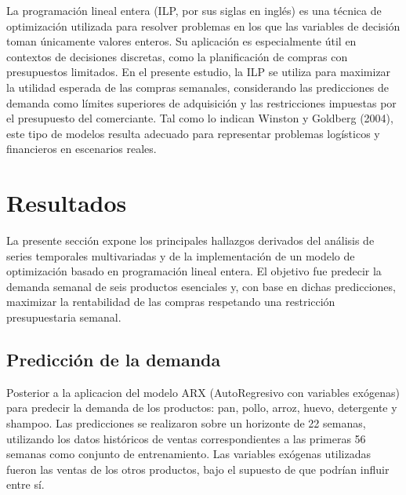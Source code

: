 \documentclass[12pt]{article}
\begin{document}
La programación lineal entera (ILP, por sus siglas en inglés) es una técnica de optimización utilizada para resolver problemas en los que las variables de decisión toman únicamente valores enteros. Su aplicación es especialmente útil en contextos de decisiones discretas, como la planificación de compras con presupuestos limitados. En el presente estudio, la ILP se utiliza para maximizar la utilidad esperada de las compras semanales, considerando las predicciones de demanda como límites superiores de adquisición y las restricciones impuestas por el presupuesto del comerciante. Tal como lo indican Winston y Goldberg (2004), este tipo de modelos resulta adecuado para representar problemas logísticos y financieros en escenarios reales.

\section{Resultados}

La presente sección expone los principales hallazgos derivados del análisis de series temporales multivariadas y de la implementación de un modelo de optimización basado en programación lineal entera. El objetivo fue predecir la demanda semanal de seis productos esenciales y, con base en dichas predicciones, maximizar la rentabilidad de las compras respetando una restricción presupuestaria semanal.

\subsection{Predicción de la demanda}

Posterior a la aplicacion del modelo ARX (AutoRegresivo con variables exógenas) para predecir la demanda de los productos: pan, pollo, arroz, huevo, detergente y shampoo. Las predicciones se realizaron sobre un horizonte de 22 semanas, utilizando los datos históricos de ventas correspondientes a las primeras 56 semanas como conjunto de entrenamiento. Las variables exógenas utilizadas fueron las ventas de los otros productos, bajo el supuesto de que podrían influir entre sí.
\end{document}
